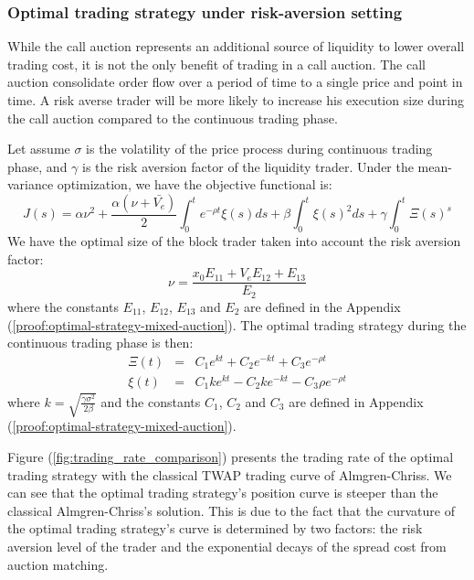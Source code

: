 \subsubsection{Optimal trading strategy under risk-aversion setting}

While the call auction represents an additional source of liquidity to lower overall trading cost, it is not the only benefit of trading in a call auction. The call auction consolidate order flow over a period of time to a single price and point in time. A risk averse trader will be more likely to increase his execution size during the call auction compared to the continuous trading phase.

\begin{theorem}
  Let assume $\sigma$ is the volatility of the price process during continuous trading phase, and $\gamma$ is the risk aversion factor of the liquidity trader. Under the mean-variance optimization, we have the objective functional is:
  \[
    J(s) = \alpha \nu^2 + \frac{\alpha (\nu + \bar{V_e})}{2} \int_0^t e^{-\rho t} \xi(s) ds + \beta \int_0^t \xi(s)^2 ds + \gamma \int_0^t \Xi(s)^s
  \]
  We have the optimal size of the block trader taken into account the risk aversion factor:
  \[
    \nu = \frac{x_0 E_{11} + V_e E_{12} + E_{13}}{E_2}
  \]
  where the constants $E_{11}$, $E_{12}$, $E_{13}$ and $E_2$ are defined in the Appendix (\ref{proof:optimal-strategy-mixed-auction}). The optimal trading strategy during the continuous trading phase is then:
  \begin{eqnarray*}
    \Xi(t) &=& C_1 e^{k t} + C_2 e^{-k t} + C_3 e^{-\rho t} \\
    \xi(t) &=& C_1 k e^{k t} - C_2 k e^{-k t} - C_3 \rho e^{-\rho t}
  \end{eqnarray*}
  where $k=\sqrt{\frac{\gamma \sigma^2}{2\beta}}$ and the constants $C_1$, $C_2$ and $C_3$ are defined in Appendix (\ref{proof:optimal-strategy-mixed-auction}).
\end{theorem}


Figure (\ref{fig:trading_rate_comparison}) presents the trading rate of the optimal trading strategy with the classical TWAP trading curve of Almgren-Chriss. We can see that the optimal trading strategy's position curve is steeper than the classical Almgren-Chriss's solution. This is due to the fact that the curvature of the optimal trading strategy's curve is determined by two factors: the risk aversion level of the trader and the exponential decays of the spread cost from auction matching.

